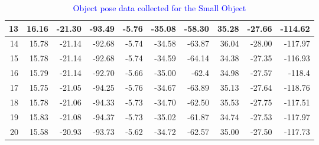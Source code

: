 \begin{table}[]
{\begin{tabular}{|r|r|r|r|r|r|r|r|r|r|}
13                            & 16.16                       & -21.30                       & -93.49                                 & -5.76                       & -35.08                      & -58.30                                  & 35.28                       & -27.66                      & -114.62                                \\ \hline
14                            & 15.78                       & -21.14                      & -92.68                                 & -5.74                       & -34.58                      & -63.87                                 & 36.04                       & -28.00                         & -117.97                                \\ \hline
15                            & 15.78                       & -21.14                      & -92.68                                 & -5.74                       & -34.59                      & -64.14                                 & 34.38                       & -27.35                      & -116.93                                \\ \hline
16                            & 15.79                       & -21.14                      & -92.70                                  & -5.66                       & -35.00                         & -62.4                                  & 34.98                       & -27.57                      & -118.4                                 \\ \hline
17                            & 15.75                       & -21.05                      & -94.25                                 & -5.76                       & -34.67                      & -63.89                                 & 35.13                       & -27.64                      & -118.76                                \\ \hline
18                            & 15.78                       & -21.06                      & -94.33                                 & -5.73                       & -34.70                       & -62.50                                  & 35.53                       & -27.75                      & -117.51                                \\ \hline
19                            & 15.83                       & -21.08                      & -94.37                                 & -5.73                       & -35.02                      & -61.87                                 & 34.74                       & -27.53                      & -117.97                                \\ \hline
20                            & 15.58                       & -20.93                      & -93.73                                 & -5.62                       & -34.72                      & -62.57                                 & 35.00                          & -27.50                       & -117.73                                \\ \hline
\end{tabular}%
}
\caption{\textcolor{blue}{Object pose data collected for the Small Object}}
\label{tab:small-object}
\end{table}
